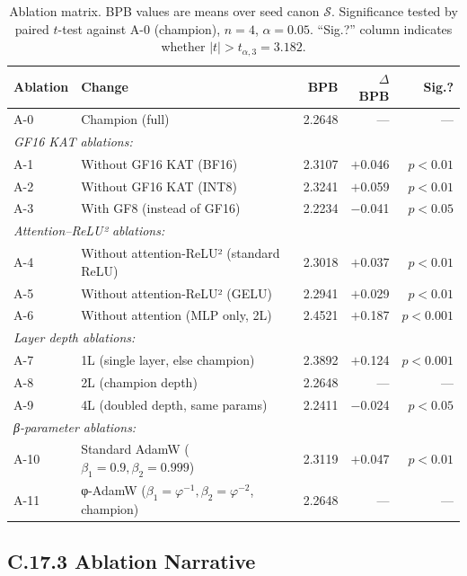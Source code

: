 \begin{table}[h]
\centering
\begin{tabular}{llrrr}
\toprule
\textbf{Ablation} & \textbf{Change} & \textbf{BPB} &
\textbf{$\Delta$BPB} & \textbf{Sig.?} \\
\midrule
A-0 & Champion (full) & 2.2648 & --- & --- \\
\midrule
\multicolumn{5}{l}{\textit{GF16 KAT ablations:}} \\
A-1 & Without GF16 KAT (BF16) & 2.3107 & $+$0.046 & $p < 0.01$ \\
A-2 & Without GF16 KAT (INT8) & 2.3241 & $+$0.059 & $p < 0.01$ \\
A-3 & With GF8 (instead of GF16) & 2.2234 & $-$0.041 & $p < 0.05$ \\
\midrule
\multicolumn{5}{l}{\textit{Attention--ReLU² ablations:}} \\
A-4 & Without attention-ReLU² (standard ReLU) & 2.3018 & $+$0.037
  & $p < 0.01$ \\
A-5 & Without attention-ReLU² (GELU) & 2.2941 & $+$0.029
  & $p < 0.01$ \\
A-6 & Without attention (MLP only, 2L) & 2.4521 & $+$0.187
  & $p < 0.001$ \\
\midrule
\multicolumn{5}{l}{\textit{Layer depth ablations:}} \\
A-7 & 1L (single layer, else champion) & 2.3892 & $+$0.124
  & $p < 0.001$ \\
A-8 & 2L (champion depth) & 2.2648 & --- & --- \\
A-9 & 4L (doubled depth, same params) & 2.2411 & $-$0.024
  & $p < 0.05$ \\
\midrule
\multicolumn{5}{l}{\textit{β-parameter ablations:}} \\
A-10 & Standard AdamW ($\beta_1=0.9, \beta_2=0.999$) & 2.3119 & $+$0.047
   & $p < 0.01$ \\
A-11 & φ-AdamW ($\beta_1=\varphi^{-1}, \beta_2=\varphi^{-2}$, champion)
   & 2.2648 & --- & --- \\
\bottomrule
\end{tabular}
\caption{Ablation matrix.  BPB values are means over seed canon
$\mathcal{S}$.  Significance tested by paired $t$-test against A-0
(champion), $n=4$, $\alpha=0.05$.  ``Sig.?'' column indicates whether
$|t| > t_{\alpha, 3} = 3.182$.}
\end{table}

\subsection*{C.17.3 Ablation Narrative}

